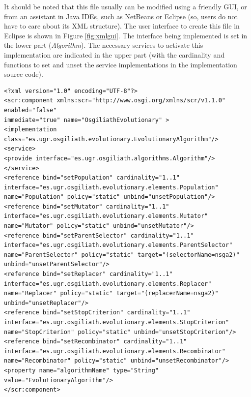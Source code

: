 It should be noted that this file usually can be modified using a friendly GUI, or from an assistant in Java IDEs, such as NetBeans or Eclipse (so, users do not have to care about its XML structure). The user interface to create this file in Eclipse is shown in Figure \ref{fig:xmlgui}. The interface being implemented is set in the lower part ({\em Algorithm}). The necessary services to activate this implementation are indicated in the upper part (with the cardinality and functions to set and unset the service implementations in the implementation source code).

\newsavebox{\mintedboxDS}
\begin{lrbox}{\mintedboxDS}
\begin{minipage}{10cm}
\begin{verbatim}
<?xml version="1.0" encoding="UTF-8"?>
<scr:component xmlns:scr="http://www.osgi.org/xmlns/scr/v1.1.0" enabled="false"
immediate="true" name="OsgiliathEvolutionary" >
<implementation class="es.ugr.osgiliath.evolutionary.EvolutionaryAlgorithm"/>
<service>
<provide interface="es.ugr.osgiliath.algorithms.Algorithm"/>
</service>
<reference bind="setPopulation" cardinality="1..1"
interface="es.ugr.osgiliath.evolutionary.elements.Population"
name="Population" policy="static" unbind="unsetPopulation"/>
<reference bind="setMutator" cardinality="1..1"
interface="es.ugr.osgiliath.evolutionary.elements.Mutator"
name="Mutator" policy="static" unbind="unsetMutator"/>
<reference bind="setParentSelector" cardinality="1..1"
interface="es.ugr.osgiliath.evolutionary.elements.ParentSelector"
name="ParentSelector" policy="static" target="(selectorName=nsga2)" 
unbind="unsetParentSelector"/>
<reference bind="setReplacer" cardinality="1..1"
interface="es.ugr.osgiliath.evolutionary.elements.Replacer"
name="Replacer" policy="static" target="(replacerName=nsga2)" 
unbind="unsetReplacer"/>
<reference bind="setStopCriterion" cardinality="1..1"
interface="es.ugr.osgiliath.evolutionary.elements.StopCriterion"
name="StopCriterion" policy="static" unbind="unsetStopCriterion"/>
<reference bind="setRecombinator" cardinality="1..1"
interface="es.ugr.osgiliath.evolutionary.elements.Recombinator"
name="Recombinator" policy="static" unbind="unsetRecombinator"/>
<property name="algorithmName" type="String" value="EvolutionaryAlgorithm"/>
</scr:component>
\end{verbatim}
\end{minipage}
\end{lrbox}

